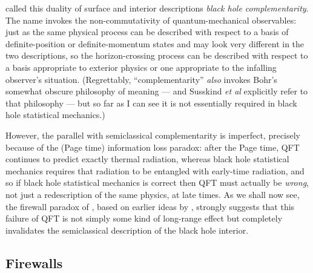 \documentclass{article}
\begin{document}
 called this duality of surface and interior descriptions \emph{black hole complementarity}. The name invokes the non-commutativity of quantum-mechanical observables: just as the same physical process can be described with respect to a basis of definite-position or definite-momentum states and may look very different in the two descriptions, so the horizon-crossing process can be described with respect to a basis appropriate to exterior physics or one appropriate to the infalling observer's situation. (Regrettably, ``complementarity'' \emph{also} invokes Bohr's somewhat obscure philosophy of meaning --- and Susskind \emph{et al} explicitly refer to that philosophy --- but so far as I can see it is not essentially required in black hole statistical mechanics.)

However, the parallel with semiclassical complementarity is imperfect, precisely because of the (Page time) information loss paradox: after the Page time, QFT continues to predict exactly thermal radiation, whereas black hole statistical mechanics requires that radiation to be entangled with early-time radiation, and so if black hole statistical mechanics is correct then QFT must actually be \emph{wrong}, not just a redescription of the same physics, at late times. As we shall now see, the firewall paradox of , based on earlier ideas by , strongly suggests that this failure of QFT is not simply some kind of long-range effect but completely invalidates the semiclassical description of the black hole interior.

\subsection{Firewalls}\label{firewall-subsection}
\end{document}
